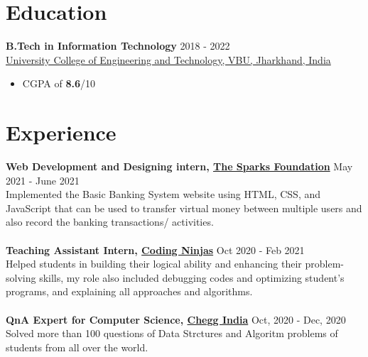 \documentclass[margin, centered]{res}
\begin{document}
\begin{resume}

\section{Education}
\textbf{B.Tech in Information Technology} \hfill 2018 - 2022 \\
\href{http://ucetvbu.ac.in/}{University College of Engineering and Technology, VBU, Jharkhand, India}
\begin{itemize}
 \item CGPA of \textbf{8.6}/10
\end{itemize}

\section{Experience}
\textbf{Web Development and Designing intern, \href{https://drive.google.com/file/d/1bM6sxmO3PgQXI3Vx1u0qqo9hIgjefS3i/view?usp=sharing}{The Sparks Foundation}} \hfill May 2021 - June 2021\\
Implemented the Basic Banking System website using HTML, CSS, and JavaScript that can be used to transfer virtual money between multiple users and also record the banking transactions/ activities.\\
\\
\textbf{Teaching Assistant Intern, \href{https://drive.google.com/file/d/1tggg7RXVF4dtAdR-jFnV6tpvBVyKcyTD/view?usp=sharing}{Coding Ninjas}} \hfill Oct 2020 - Feb 2021 \\
Helped students in building their logical ability and enhancing their problem-solving skills, my role also included debugging codes and optimizing student's programs, and explaining all approaches and algorithms.\\
\\
\textbf{QnA Expert for Computer Science, \href{https://www.chegg.com/}{Chegg India}} \hfill Oct, 2020 - Dec, 2020 \\
  Solved more than 100 questions of Data Strctures and Algoritm problems of students from all over the world.
  

\end{resume}
\end{document}
